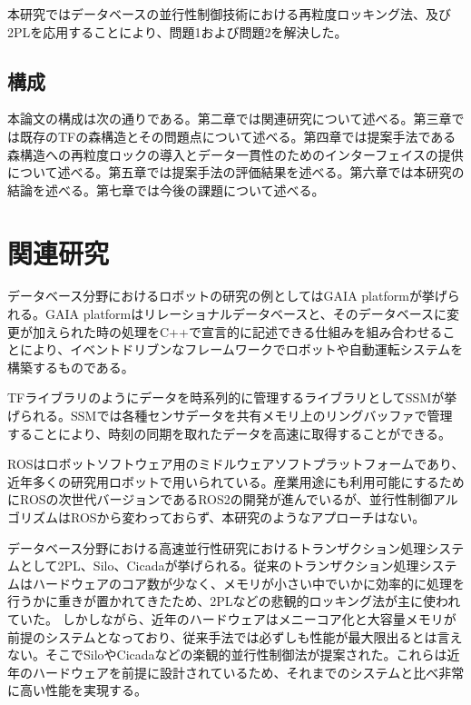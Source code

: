 \documentclass[a4paper]{jreport}	%
\begin{document}
本研究ではデータベースの並行性制御技術における再粒度ロッキング法、及び2PLを応用することにより、問題1および問題2を解決した。

\section{構成}
本論文の構成は次の通りである。第二章では関連研究について述べる。第三章では既存のTFの森構造とその問題点について述べる。第四章では提案手法である森構造への再粒度ロックの導入とデータ一貫性のためのインターフェイスの提供について述べる。第五章では提案手法の評価結果を述べる。第六章では本研究の結論を述べる。第七章では今後の課題について述べる。

\chapter{関連研究}

データベース分野におけるロボットの研究の例としてはGAIA platform\cite{gaia}が挙げられる。GAIA platformはリレーショナルデータベースと、そのデータベースに変更が加えられた時の処理をC++で宣言的に記述できる仕組みを組み合わせることにより、イベントドリブンなフレームワークでロボットや自動運転システムを構築するものである。

TFライブラリのようにデータを時系列的に管理するライブラリとしてSSMが挙げられる。SSMでは各種センサデータを共有メモリ上のリングバッファで管理することにより、時刻の同期を取れたデータを高速に取得することができる。


ROSはロボットソフトウェア用のミドルウェアソフトプラットフォームであり、近年多くの研究用ロボットで用いられている。産業用途にも利用可能にするためにROSの次世代バージョンであるROS2\cite{ros2}の開発が進んでいるが、並行性制御アルゴリズムはROSから変わっておらず、本研究のようなアプローチはない。

データベース分野における高速並行性研究におけるトランザクション処理システムとして2PL、Silo、Cicadaが挙げられる。従来のトランザクション処理システムはハードウェアのコア数が少なく、メモリが小さい中でいかに効率的に処理を行うかに重きが置かれてきたため、2PLなどの悲観的ロッキング法が主に使われていた。
しかしながら、近年のハードウェアはメニーコア化と大容量メモリが前提のシステムとなっており、従来手法では必ずしも性能が最大限出るとは言えない。そこでSilo\cite{silo}やCicada\cite{Cicada}などの楽観的並行性制御法が提案された。これらは近年のハードウェアを前提に設計されているため、それまでのシステムと比べ非常に高い性能を実現する。
\end{document}
